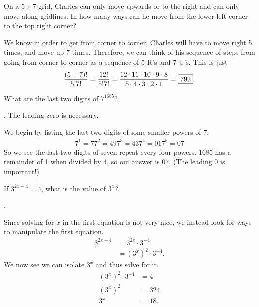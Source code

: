 \documentclass[11pt]{article}
\DeclareRobustCommand{\frac}[3][0pt]{%
  {\begingroup\hspace{#1}#2\hspace{#1}\endgroup\over\hspace{#1}#3\hspace{#1}}}
\begin{document}
\begin{problem}On a $5 \times 7$ grid, Charles can only move upwards or to the right and can only move along gridlines. In how many ways can he move from the lower left corner to the top right corner? 
\end{problem}
\begin{answer}
\end{answer}
\begin{solution}
We know in order to get from corner to corner, Charles will have to move right 5 times, and move up 7 times. Therefore, we can think of his sequence of steps from going from corner to corner as a sequence of 5 R’s and 7 U’s. This is just
$$\frac{(5+7)!}{5!7!}=\frac{12!}{5!7!} = \frac{12 \cdot 11 \cdot 10 \cdot 9 \cdot 8}{5 \cdot 4 \cdot 3 \cdot 2 \cdot 1} = \boxed{792}.$$
\end{solution}

\begin{problem}What are the last two digits of $7^{1685}$?
\end{problem}
\begin{answer}
. The leading zero is necessary.
\end{answer}
\begin{solution}
We begin by listing the last two digits of some smaller powers of 7.
\begin{align*}
7^1 = 7
7^2 = 49
7^3 = 43
7^4 = 01
7^5 = 07
\end{align*}
So we see the last two digits of seven repeat every four powers. 1685 has a remainder of 1 when divided by 4, so our answer is $\boxed{07}$. (The leading 0 is important!)
\end{solution}

\begin{problem}If $3^{2x-4} = 4$, what is the value of $3^{x}$?
\end{problem}
\begin{answer}
.
\end{answer}
\begin{solution}
Since solving for $x$ in the first equation is not very nice, we instead look for ways to manipulate the first equation. 
\begin{align*}
3^{2x-4} &= 3^{2x} \cdot 3^{-4} \\
&= (3^x)^2 \cdot 3^{-4}.
\end{align*}
We now see we can isolate $3^{x}$ and thus solve for it.
\begin{align*}
(3^x)^2 \cdot 3^{-4} &= 4 \\
(3^x)^2 &= 324 \\
3^x &= \boxed{18}.
\end{align*}
\end{solution}
\end{document}
